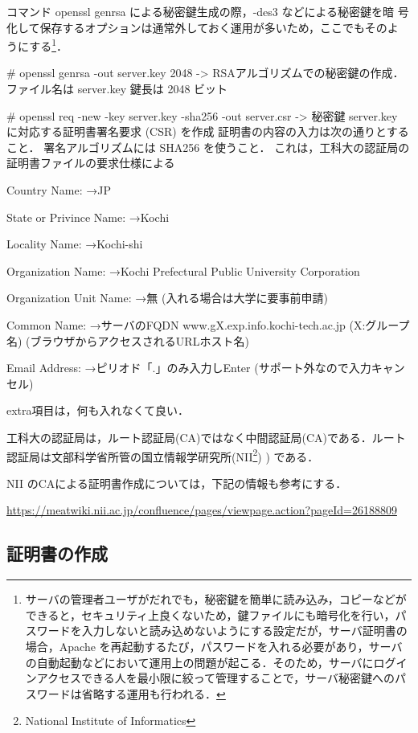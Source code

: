 コマンド openssl genrsa による秘密鍵生成の際，-des3 などによる秘密鍵を暗
号化して保存するオプションは通常外しておく運用が多いため，ここでもそのよ
うにする\footnote{サーバの管理者ユーザがだれでも，秘密鍵を簡単に読み込み，コピーなどができると，セキュリティ上良くないため，鍵ファイルにも暗号化を行い，パスワードを入力しないと読み込めないようにする設定だが，サーバ証明書の場合，Apache を再起動するたび，パスワードを入れる必要があり，サーバの自動起動などにおいて運用上の問題が起こる．そのため，サーバにログインアクセスできる人を最小限に絞って管理することで，サーバ秘密鍵へのパスワードは省略する運用も行われる．}．

\begin{cli}
# openssl genrsa -out server.key 2048
-> RSAアルゴリズムでの秘密鍵の作成．ファイル名は server.key 鍵長は 2048 ビット

# openssl req -new -key server.key -sha256 -out server.csr
-> 秘密鍵 server.key に対応する証明書署名要求 (CSR) を作成
  証明書の内容の入力は次の通りとすること．
  署名アルゴリズムには SHA256 を使うこと．
  これは，工科大の認証局の証明書ファイルの要求仕様による

Country Name:
→JP

State or Privince Name:
→Kochi

Locality Name:
→Kochi-shi

Organization Name:
→Kochi Prefectural Public University Corporation

Organization Unit Name:
→無
(入れる場合は大学に要事前申請)

Common Name:
→サーバのFQDN
   www.gX.exp.info.kochi-tech.ac.jp
   (X:グループ名)
  (ブラウザからアクセスされるURLホスト名)

Email Address:
→ピリオド「.」のみ入力しEnter
 (サポート外なので入力キャンセル)

extra項目は，何も入れなくて良い．

\end{cli}

工科大の認証局は，ルート認証局(CA)ではなく中間認証局(CA)である．ルート認証局は文部科学省所管の国立情報学研究所(NII\footnote{National Institute of Informatics}) ) である．

NII のCAによる証明書作成については，下記の情報も参考にする．

\url{https://meatwiki.nii.ac.jp/confluence/pages/viewpage.action?pageId=26188809}

\subsection{証明書の作成}

